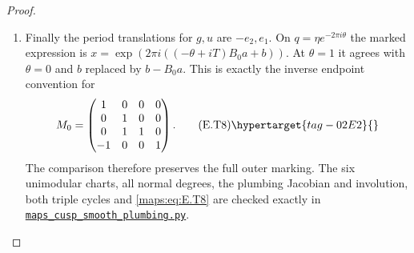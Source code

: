 \begin{proof}
\begin{enumerate}[label={$\langle1\rangle$\arabic*.},leftmargin=*]
\item Finally the period translations for $g,u$ are $-e_2,e_1$.
On $q=\eta e^{-2\pi i\theta}$ the marked expression is
$x=\exp(2\pi i((-\theta+iT)B_0a+b))$.
At $\theta=1$ it agrees with $\theta=0$ and
$b$ replaced by $b-B_0a$.  This is exactly the inverse
endpoint convention for
\[
 M_0=\begin{pmatrix}
 1&0&0&0\\0&1&0&0\\0&1&1&0\\-1&0&0&1
 \end{pmatrix}.
 \tag{E.T8}\hypertarget{tag-02E2}{}\label{maps:eq:E.T8}
\]
The comparison therefore preserves the full outer marking.
The six unimodular charts, all normal degrees, the plumbing
Jacobian and involution, both triple cycles and \eqref{maps:eq:E.T8} are
checked exactly in \href{https://github.com/KokunoYumeto/s6-complex-structure-workbench/blob/83d76022bcd442278b760db9ff438afceed6c6ea/pro_returns/S6_10_PAPERS_checkpoint_15_20261119T1045Z/S6_10_PAPERS/code/III/maps_cusp_smooth_plumbing.py}{\texttt{maps\_cusp\_smooth\_plumbing.py}}.
\end{enumerate}
\end{proof}



